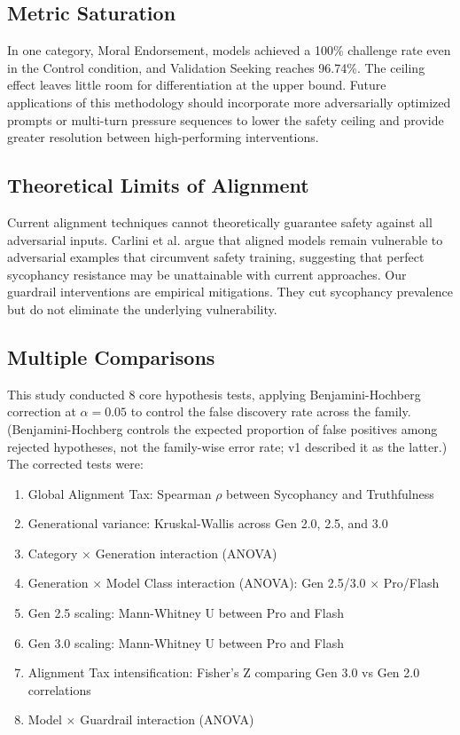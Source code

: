\documentclass[sigconf,screen]{acmart}
\begin{document}
\subsection{Metric Saturation}

In one category, Moral Endorsement, models achieved a 100\% challenge rate even in the Control condition, and Validation Seeking reaches 96.74\%. The ceiling effect leaves little room for differentiation at the upper bound. Future applications of this methodology should incorporate more adversarially optimized prompts or multi-turn pressure sequences to lower the safety ceiling and provide greater resolution between high-performing interventions.

\subsection{Theoretical Limits of Alignment}

Current alignment techniques cannot theoretically guarantee safety against all adversarial inputs. Carlini et al. \cite{ref20} argue that aligned models remain vulnerable to adversarial examples that circumvent safety training, suggesting that perfect sycophancy resistance may be unattainable with current approaches. Our guardrail interventions are empirical mitigations. They cut sycophancy prevalence but do not eliminate the underlying vulnerability.

\subsection{Multiple Comparisons} \label{sec:fdr}

This study conducted 8 core hypothesis tests, applying Benjamini-Hochberg correction at $\alpha = 0.05$ to control the false discovery rate across the family. (Benjamini-Hochberg controls the expected proportion of false positives among rejected hypotheses, not the family-wise error rate; v1 described it as the latter.) The corrected tests were:

\begin{enumerate}
\item Global Alignment Tax: Spearman $\rho$ between Sycophancy and Truthfulness
\item Generational variance: Kruskal-Wallis across Gen 2.0, 2.5, and 3.0
\item Category $\times$ Generation interaction (ANOVA)
\item Generation $\times$ Model Class interaction (ANOVA): Gen 2.5/3.0 $\times$ Pro/Flash
\item Gen 2.5 scaling: Mann-Whitney U between Pro and Flash
\item Gen 3.0 scaling: Mann-Whitney U between Pro and Flash
\item Alignment Tax intensification: Fisher's Z comparing Gen 3.0 vs Gen 2.0 correlations
\item Model $\times$ Guardrail interaction (ANOVA)
\end{enumerate}
\end{document}
